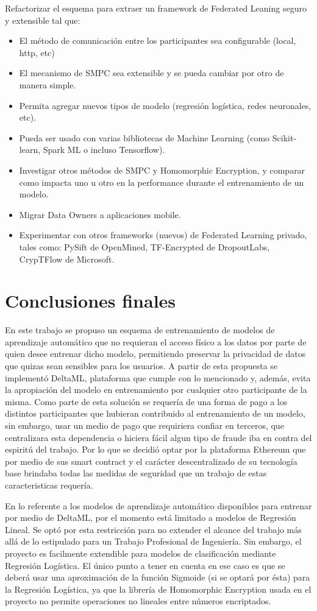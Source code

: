 \documentclass[
11pt, %
oneside, %
spanish, %
singlespacing, %
parskip, %
headsepline, %
chapterinoneline, %
]{MastersDoctoralThesis} %
\begin{document}
Refactorizar el esquema para extraer un framework de Federated Leaning seguro y extensible tal que:
\begin{itemize}
\item El método de comunicación entre los participantes sea configurable (local, http, etc)
\item El mecanismo de SMPC sea extensible y se pueda cambiar por otro de manera simple.
\item Permita agregar nuevos tipos de modelo (regresión logística, redes neuronales, etc).
\item Pueda ser usado con varias bibliotecas de Machine Learning (como Scikit-learn, Spark ML o incluso Tensorflow).
\item Investigar otros métodos de SMPC y Homomorphic Encryption, y comparar como impacta uno u otro en la performance durante el entrenamiento de un modelo.
\item Migrar Data Owners a aplicaciones mobile.
\item Experimentar con otros frameworks (nuevos) de Federated Learning privado, tales como: PySift de OpenMined, TF-Encrypted de DropoutLabs, CrypTFlow de Microsoft.
\end{itemize}
 
\chapter{Conclusiones finales}
En este trabajo se propuso un esquema de entrenamiento de modelos de aprendizaje automático que no requieran el acceso físico a los datos por parte de quien desee entrenar dicho modelo, permitiendo preservar la privacidad de datos que quizas sean sensibles para los usuarios. A partir de esta propuesta se implementó DeltaML, plataforma que cumple con lo mencionado y, además, evita la apropiación del modelo en entrenamiento por cualquier otro participante de la misma. Como parte de esta solución se requería de una forma de pago a los distintos participantes que hubieran contribuido al entrenamiento de un modelo, sin embargo, usar un medio de pago que requiriera confiar en terceros, que centralizara esta dependencia o hiciera fácil algun tipo de fraude iba en contra del espiritú del trabajo. Por lo que se decidió optar por la plataforma Ethereum que por medio de sus smart contract y el carácter descentralizado de su tecnología base brindaba todas las medidas de seguridad que un trabajo de estas caracteristicas requería.

En lo referente a los modelos de aprendizaje automático disponibles para entrenar por medio de DeltaML, por el momento está limitado a modelos de Regresión Lineal. Se optó por esta restricción para no extender el alcance del trabajo más allá de lo estipulado para un Trabajo Profesional de Ingeniería. Sin embargo, el proyecto es facilmente extendible para modelos de clasificación mediante Regresión Logística. El único punto a tener en cuenta en ese caso es que se deberá usar una aproximación de la función Sigmoide (si se optará por ésta) para la Regresión Logística, ya que la librería de Homomorphic Encryption usada en el proyecto no permite operaciones no lineales entre números encriptados.
\end{document}
